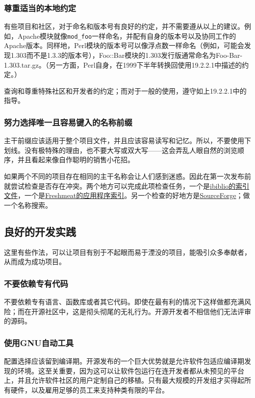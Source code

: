 \documentclass[12pt,oneside]{book}
\begin{document}
\subsubsection{尊重适当的本地约定}
有些项目和社区，对于命名和版本号有良好的约定，并不需要遵从以上的建议。例如，Apache模块就像\verb+mod_foo+一样命名，并配有自身的版本号以及协同工作的Apache版本。同样地，Perl模块的版本号可以像浮点数一样命名（例如，可能会发现1.303而不是1.3.3的版本号），Foo::Bar模块的1.303发行版通常命名为Foo-Bar-1.303.tar.gz。（另一方面，Perl自身，在1999下半年转换回使用19.2.2.1中描述的约定。）

查询和尊重特殊社区和开发者的约定；而对于一般的使用，遵守如上19.2.2.1中的指导。

\subsubsection{努力选择唯一且容易键入的名称前缀}
主干前缀应该适用于整个项目文件，并且应该容易读写和记忆。所以，不要使用下划线。没有极特殊的理由，也不要大写或双大写——这会弄乱人眼自然的浏览顺序，并且看起来像自作聪明的销售小花招。

如果两个不同的项目存在相同的主干名称会让人们感到迷惑。因此在第一次发布前就尝试检查是否存在冲突。两个地方可以完成此项检查任务，一个是\href{http://metalab.unc.edu/pub/Linux}{ibiblio的索引文件}，一个是\href{http://www.freshmeat.net/}{Freshmeat的应用程序索引}。另一个检查的好地方是\href{http://www.sourceforge.net/}{SourceForge}；做一个名称搜索。

\subsection{良好的开发实践}
这里有些作法，可以让项目有别于不起眼而易于湮没的项目，能吸引众多奉献者，从而成为成功项目。

\subsubsection{不要依赖专有代码}
不要依赖专有语言、函数库或者其它代码。即使在最有利的情况下这样做都充满风险；而在开源社区中，这是彻头彻尾的无礼行为。开源开发者不相信他们无法评审的源码。

\subsubsection{使用GNU自动工具}
配置选择应该留到编译期。开源发布的一个巨大优势就是允许软件包适应编译期发现的环境。这至关重要，因为这可以让软件包运行在连开发者都从未预见的平台上，并且允许软件社区的用户定制自己的移植。只有最大规模的开发组才买得起所有硬件，以及雇用足够的员工来支持种类有限的平台。
\end{document}
